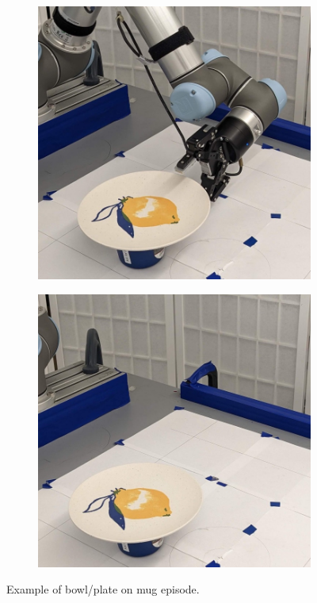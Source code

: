 \documentclass{article}
\begin{document}
\begin{figure}[]
\begin{subfigure}{(\linewidth - 0.05\linewidth)/5}
    \end{subfigure}
    \begin{subfigure}{(\linewidth - 0.05\linewidth)/5}
        \centering
        \includegraphics[width=\linewidth]{figures/episodes/bowl_on_mug/9.jpg}
    \end{subfigure}
    \begin{subfigure}{(\linewidth - 0.05\linewidth)/5}
        \centering
        \includegraphics[width=\linewidth]{figures/episodes/bowl_on_mug/10.jpg}
    \end{subfigure}

    \caption{Example of bowl/plate on mug episode.}
    \label{fig:bowl_on_mug_episode}
\end{figure}
\end{document}
